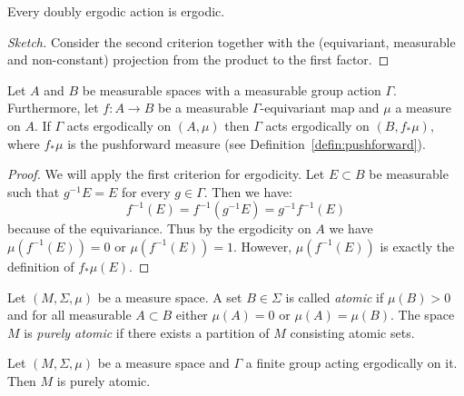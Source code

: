 \begin{prop}
  \label{prop:coeff-ergodic}
  Every doubly ergodic action is ergodic.
\end{prop}

\begin{proof}[Sketch]
  Consider the second criterion together with the (equivariant, measurable and non-constant) projection from the product to the first factor.
\end{proof}

\begin{lemma}
  \label{lemma:ergodicity-pushforward}
  Let \(A\) and \(B\) be measurable spaces with a measurable group action \(\Gamma\). Furthermore, let \(f\colon A \to B\) be a measurable \(\Gamma\)-equivariant map and \(\mu\) a measure on \(A\). If \(\Gamma\) acts ergodically on \((A, \mu)\) then \(\Gamma\) acts ergodically on \((B, f_\ast \mu)\), where \(f_\ast \mu\) is the pushforward measure (see Definition~\ref{defin:pushforward}).
\end{lemma}

\begin{proof}
  We will apply the first criterion for ergodicity. Let \(E \subset B\) be measurable such that \(g^{-1} E = E\) for every \(g \in \Gamma\). Then we have:
  \[
    f^{-1}(E) = f^{-1}(g^{-1}E) = g^{-1}f^{-1}(E)
  \]
  because of the equivariance. Thus by the ergodicity on \(A\) we have \(\mu(f^{-1}(E))= 0\) or \(\mu(f^{-1}(E)) = 1\). However, \(\mu(f^{-1}(E))\) is exactly the definition of \(f_\ast\mu(E)\).
\end{proof}

\begin{defin}
  \label{defin:atomic}
  Let \((M, \Sigma, \mu)\) be a measure space. A set \(B \in \Sigma\) is called \emph{atomic} if \(\mu(B) > 0\) and for all measurable \(A \subset B\) either \(\mu(A) = 0\) or \(\mu(A) = \mu(B)\). The space \(M\) is \emph{purely atomic} if there exists a partition of \(M\) consisting atomic sets.
\end{defin}

\begin{lemma}
  \label{lem:ergodic-atomic}
  Let \((M, \Sigma, \mu)\) be a measure space and \(\Gamma\) a finite group acting ergodically on it. Then \(M\) is purely atomic.
\end{lemma}

